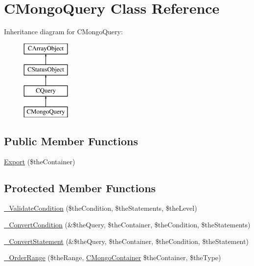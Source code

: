 \hypertarget{class_c_mongo_query}{\section{C\-Mongo\-Query Class Reference}
\label{class_c_mongo_query}
}
Inheritance diagram for C\-Mongo\-Query\-:\begin{figure}[H]
\begin{center}
\leavevmode
\includegraphics[height=4.000000cm]{class_c_mongo_query}
\end{center}
\end{figure}
\subsection*{Public Member Functions}
\begin{DoxyCompactItemize}
\item 
\hyperlink{class_c_mongo_query_aa25b073480c02f12b91bf262071fa884}{Export} (\$the\-Container)
\end{DoxyCompactItemize}
\subsection*{Protected Member Functions}
\begin{DoxyCompactItemize}
\item 
\hyperlink{class_c_mongo_query_a651af70656cb9894ef1885a711a0c141}{\-\_\-\-Validate\-Condition} (\$the\-Condition, \$the\-Statements, \$the\-Level)
\item 
\hyperlink{class_c_mongo_query_a8cda9306ac308f5c33456e77de004ebb}{\-\_\-\-Convert\-Condition} (\&\$the\-Query, \$the\-Container, \$the\-Condition, \$the\-Statements)
\item 
\hyperlink{class_c_mongo_query_a1f381db3f898f4c9cd333ffd2e3e989b}{\-\_\-\-Convert\-Statement} (\&\$the\-Query, \$the\-Container, \$the\-Condition, \$the\-Statement)
\item 
\hyperlink{class_c_mongo_query_a32fd372e1c39add42d078441eda3f1c3}{\-\_\-\-Order\-Range} (\$the\-Range, \hyperlink{class_c_mongo_container}{C\-Mongo\-Container} \$the\-Container, \$the\-Type)
\end{DoxyCompactItemize}


